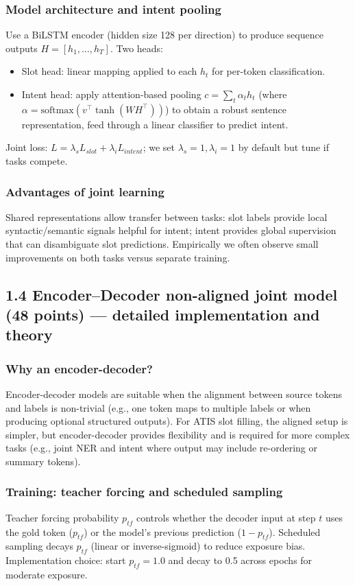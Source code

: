 \documentclass[conference]{IEEEtran}
\begin{document}
\subsubsection{Model architecture and intent pooling}
Use a BiLSTM encoder (hidden size 128 per direction) to produce sequence outputs $H = [h_1, \dots, h_T]$. Two heads:
\begin{itemize}
  \item Slot head: linear mapping applied to each $h_t$ for per-token classification.\
  \item Intent head: apply attention-based pooling $c = \sum_t \alpha_t h_t$ (where $\alpha = \text{softmax}(v^\top \tanh(W H^\top))$) to obtain a robust sentence representation, feed through a linear classifier to predict intent.
\end{itemize}
Joint loss: $L = \lambda_s L_{slot} + \lambda_i L_{intent}$; we set $\lambda_s=1,\lambda_i=1$ by default but tune if tasks compete.

\subsubsection{Advantages of joint learning}
Shared representations allow transfer between tasks: slot labels provide local syntactic/semantic signals helpful for intent; intent provides global supervision that can disambiguate slot predictions. Empirically we often observe small improvements on both tasks versus separate training.

\subsection{1.4 Encoder--Decoder non-aligned joint model (48 points) — detailed implementation and theory}
\subsubsection{Why an encoder-decoder?}
Encoder-decoder models are suitable when the alignment between source tokens and labels is non-trivial (e.g., one token maps to multiple labels or when producing optional structured outputs). For ATIS slot filling, the aligned setup is simpler, but encoder-decoder provides flexibility and is required for more complex tasks (e.g., joint NER and intent where output may include re-ordering or summary tokens).

\subsubsection{Training: teacher forcing and scheduled sampling}
Teacher forcing probability $p_{tf}$ controls whether the decoder input at step $t$ uses the gold token ($p_{tf}$) or the model's previous prediction ($1-p_{tf}$). Scheduled sampling decays $p_{tf}$ (linear or inverse-sigmoid) to reduce exposure bias. Implementation choice: start $p_{tf}=1.0$ and decay to 0.5 across epochs for moderate exposure.
\end{document}
